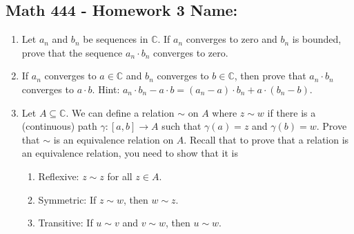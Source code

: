 \documentclass[11pt]{article}
\newcommand{\R}{\mathbb{R}}
\newcommand{\C}{\mathbb{C}}
\newcommand{\re}{\operatorname{Re}}
\newcommand{\im}{\operatorname{Im}}
\begin{document}
\pagestyle{empty}
\subsection*{Math 444 - Homework 3 \hfill Name: \underline{\hspace*{2in}}}

\begin{enumerate}

\item Let $a_n$ and $b_n$ be sequences in $\C$.  If $a_n$ converges to zero and $b_n$ is bounded, prove that the sequence $a_n \cdot b_n$ converges to zero.  
\vfill

\item If $a_n$ converges to $a \in \C$ and $b_n$ converges to $b \in \C$, then prove that $a_n \cdot b_n$ converges to $a \cdot b$. Hint: $a_n \cdot b_n - a \cdot b = (a_n - a) \cdot b_n + a \cdot (b_n - b)$. 
\vfill




\item Let $A \subseteq \C$.  We can define a relation $\sim$ on $A$ where $z \sim w$ if there is a (continuous) path $\gamma:[a,b] \rightarrow A$ such that $\gamma(a) = z$ and $\gamma(b) = w$. Prove that $\sim$ is an equivalence relation on $A$.  Recall that to prove that a relation is an equivalence relation, you need to show that it is
\begin{enumerate}
\item Reflexive: $z \sim z$ for all $z \in A$.
\item Symmetric: If $z \sim w$, then $w \sim z$.
\item Transitive: If $u \sim v$ and $v \sim w$, then $u \sim w$. 
\end{enumerate}
\vfill




\end{enumerate}
\end{document}
